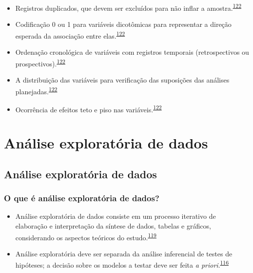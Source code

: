\documentclass[
  a4paper,
]{book}
\begin{document}
\begin{itemize}
\item
  Registros duplicados, que devem ser excluídos para não inflar a amostra.\textsuperscript{\protect\hyperlink{ref-huebner2016}{122}}
\item
  Codificação 0 ou 1 para variáveis dicotômicas para representar a direção esperada da associação entre elas.\textsuperscript{\protect\hyperlink{ref-huebner2016}{122}}
\item
  Ordenação cronológica de variáveis com registros temporais (retrospectivos ou prospectivos).\textsuperscript{\protect\hyperlink{ref-huebner2016}{122}}
\item
  A distribuição das variáveis para verificação das suposições das análises planejadas.\textsuperscript{\protect\hyperlink{ref-huebner2016}{122}}
\item
  Ocorrência de efeitos teto e piso nas variáveis.\textsuperscript{\protect\hyperlink{ref-huebner2016}{122}}
\end{itemize}

\hypertarget{analise-exploratoria-dados}{%
\chapter{\texorpdfstring{\textbf{Análise exploratória de dados}}{Análise exploratória de dados}}\label{analise-exploratoria-dados}}

\hypertarget{analise-exploratoria}{%
\section{Análise exploratória de dados}\label{analise-exploratoria}}

\hypertarget{o-que-uxe9-anuxe1lise-exploratuxf3ria-de-dados}{%
\subsection{O que é análise exploratória de dados?}\label{o-que-uxe9-anuxe1lise-exploratuxf3ria-de-dados}}

\begin{itemize}
\item
  Análise exploratória de dados consiste em um processo iterativo de elaboração e interpretação da síntese de dados, tabelas e gráficos, considerando os aspectos teóricos do estudo.\textsuperscript{\protect\hyperlink{ref-Ferketich1986}{119}}
\item
  Análise exploratória deve ser separada da análise inferencial de testes de hipóteses; a decisão sobre os modelos a testar deve ser feita \emph{a priori}.\textsuperscript{\protect\hyperlink{ref-zuur2009}{116}}
\end{itemize}
\end{document}
